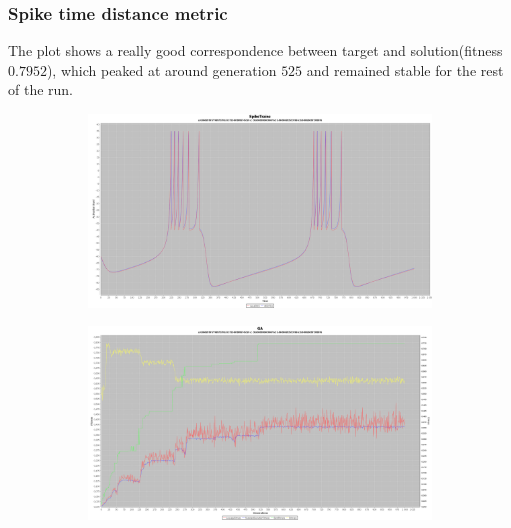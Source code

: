 \documentclass[10pt]{article}
\begin{document}
		\subsubsection{Spike time distance metric}
			The plot shows a really good correspondence between target and solution(fitness $0.7952$), which peaked at around generation $525$ and remained stable for the rest of the run.
			\begin{figure}[H]
				\centering
					\begin{subfigure}{.5\textwidth}
						\centering
						\includegraphics[width=\linewidth]{./../images/izzy3/time/plot.png}
						
						\label{fig:sub7a}
					\end{subfigure}%
					\begin{subfigure}{.5\textwidth}
						\centering
						\includegraphics[width=\linewidth]{./../images/izzy3/time/prog.png}
						
						\label{fig:sub7b}
					\end{subfigure}
					
					\label{fig:plot7}
			\end{figure}
			
\end{document}
